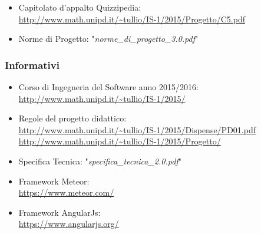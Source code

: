 \documentclass[a4paper,11pt]{article}
\begin{document}
		\begin{itemize}
			\item Capitolato d'appalto Quizzipedia:\\
			\url{http://www.math.unipd.it/~tullio/IS-1/2015/Progetto/C5.pdf}
			\item Norme di Progetto: "\textit{norme\_di\_progetto\_3.0.pdf}"
		\end{itemize}
		\subsubsection{Informativi}
		\begin{itemize}
			\item Corso di Ingegneria del Software anno 2015/2016:\\
			\url{http://www.math.unipd.it/~tullio/IS-1/2015/}
			\item Regole del progetto didattico:\\
			\url{http://www.math.unipd.it/~tullio/IS-1/2015/Dispense/PD01.pdf}\\
			\url{http://www.math.unipd.it/~tullio/IS-1/2015/Progetto/}
			\item Specifica Tecnica: "\textit{specifica\_tecnica\_2.0.pdf}"
			\item Framework Meteor:\\
			\url{https://www.meteor.com/}
			\item Framework AngularJs:\\
			\url{https://www.angularjs.org/}
		\end{itemize}
	\pagebreak
	\newpage
	
	\newpage
	
	\newpage
	
	\newpage
	
\end{document}
